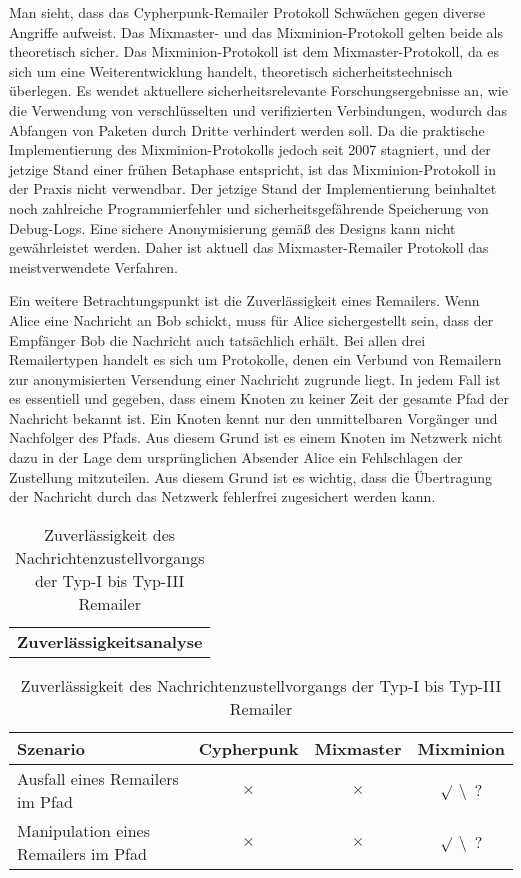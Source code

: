 Man sieht, dass das Cypherpunk-Remailer Protokoll Schwächen gegen diverse Angriffe aufweist. Das Mixmaster- und das Mixminion-Protokoll gelten beide als theoretisch sicher. Das Mixminion-Protokoll ist dem Mixmaster-Protokoll, da es sich um eine Weiterentwicklung handelt, theoretisch sicherheitstechnisch überlegen. Es wendet aktuellere sicherheitsrelevante Forschungsergebnisse an, wie die Verwendung von verschlüsselten und verifizierten Verbindungen, wodurch das Abfangen von Paketen durch Dritte verhindert werden soll. Da die praktische Implementierung des Mixminion-Protokolls jedoch seit 2007 stagniert, und der jetzige Stand einer frühen Betaphase entspricht, ist das Mixminion-Protokoll in der Praxis nicht verwendbar. Der jetzige Stand der Implementierung beinhaltet noch zahlreiche Programmierfehler und sicherheitsgefährende Speicherung von Debug-Logs. Eine sichere Anonymisierung gemäß des Designs kann nicht gewährleistet werden. Daher ist aktuell das Mixmaster-Remailer Protokoll das meistverwendete Verfahren. 

Ein weitere Betrachtungspunkt ist die Zuverlässigkeit eines Remailers. Wenn Alice eine Nachricht an Bob schickt, muss für Alice sichergestellt sein, dass der Empfänger Bob die Nachricht auch tatsächlich erhält. Bei allen drei Remailertypen handelt es sich um Protokolle, denen ein Verbund von Remailern zur anonymisierten Versendung einer Nachricht zugrunde liegt. In jedem Fall ist es essentiell und gegeben, dass einem Knoten zu keiner Zeit der gesamte Pfad der Nachricht bekannt ist. Ein Knoten kennt nur den unmittelbaren Vorgänger und Nachfolger des Pfads. Aus diesem Grund ist es einem Knoten im Netzwerk nicht dazu in der Lage dem ursprünglichen Absender Alice ein Fehlschlagen der Zustellung mitzuteilen. Aus diesem Grund ist es wichtig, dass die Übertragung der Nachricht durch das Netzwerk fehlerfrei zugesichert werden kann.

\begin{table}[htbp]
	\centering
	\begin{tabular}{c}
		\textbf{Zuverlässigkeitsanalyse}
	\end{tabular}
		
	\begin{tabular}{m{7.5cm} || c | c | c}
		\hline
		\textbf{Szenario} & \textbf{Cypherpunk} & \textbf{Mixmaster} & \textbf{Mixminion} \\
		\hline
		Ausfall eines Remailers im Pfad & $\times$ & $\times$ & $\surd$ \textbackslash ~? \\
		Manipulation eines Remailers im Pfad & $\times$ & $\times$ & $\surd$ \textbackslash ~? \\
	\end{tabular}

	\caption{Zuverlässigkeit des Nachrichtenzustellvorgangs der Typ-I bis Typ-III Remailer}
\end{table}

